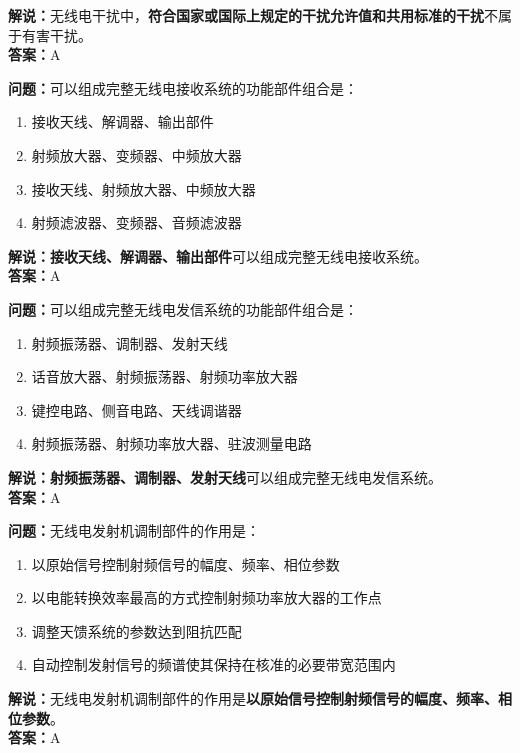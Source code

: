 \textbf{解说：}无线电干扰中，\textbf{符合国家或国际上规定的干扰允许值和共用标准的干扰}不属于有害干扰。\\\textbf{答案：}A%



\textbf{问题：}可以组成完整无线电接收系统的功能部件组合是：

\begin{enumerate}[label=\Alph*), leftmargin=1cm]
	\item 接收天线、解调器、输出部件
	\item 射频放大器、变频器、中频放大器
	\item 接收天线、射频放大器、中频放大器
	\item 射频滤波器、变频器、音频滤波器
\end{enumerate}

\textbf{解说：}\textbf{接收天线、解调器、输出部件}可以组成完整无线电接收系统。\\\textbf{答案：}A%



\textbf{问题：}可以组成完整无线电发信系统的功能部件组合是：

\begin{enumerate}[label=\Alph*), leftmargin=1cm]
	\item 射频振荡器、调制器、发射天线
	\item 话音放大器、射频振荡器、射频功率放大器
	\item 键控电路、侧音电路、天线调谐器
	\item 射频振荡器、射频功率放大器、驻波测量电路
\end{enumerate}

\textbf{解说：}\textbf{射频振荡器、调制器、发射天线}可以组成完整无线电发信系统。\\\textbf{答案：}A%



\textbf{问题：}无线电发射机调制部件的作用是：

\begin{enumerate}[label=\Alph*), leftmargin=1cm]
	\item 以原始信号控制射频信号的幅度、频率、相位参数
	\item 以电能转换效率最高的方式控制射频功率放大器的工作点
	\item 调整天馈系统的参数达到阻抗匹配
	\item 自动控制发射信号的频谱使其保持在核准的必要带宽范围内
\end{enumerate}

\textbf{解说：}无线电发射机调制部件的作用是\textbf{以原始信号控制射频信号的幅度、频率、相位参数}。\\\textbf{答案：}A%



